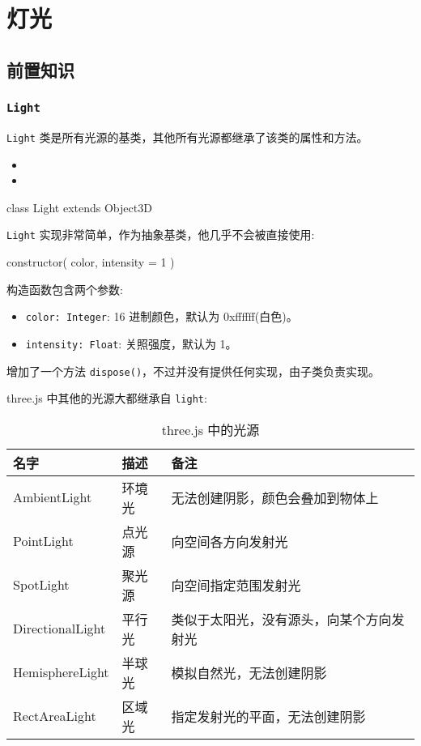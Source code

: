 \section{灯光}
\subsection{前置知识}
\subsubsection*{\texttt{Light}}

\texttt{Light} 类是所有光源的基类，其他所有光源都继承了该类的属性和方法。
\begin{itemize}
  \item {}
  \item {}
\end{itemize}

\begin{JavaScript}
class Light extends Object3D
\end{JavaScript}

\texttt{Light} 实现非常简单，作为抽象基类，他几乎不会被直接使用:

\begin{JavaScript}
constructor( color, intensity = 1 )
\end{JavaScript}

构造函数包含两个参数:
\begin{itemize}
  \item \texttt{color: Integer}: 16 进制颜色，默认为 0xffffff(白色)。
  \item \texttt{intensity: Float}: 关照强度，默认为 1。
\end{itemize}

增加了一个方法 \texttt{dispose()}，不过并没有提供任何实现，由子类负责实现。

three.js 中其他的光源大都继承自 \texttt{light}:

\begin{table}[H]
  \centering
  \small
  \caption{three.js 中的光源}
  \label{table:three.js 中的光源}
  \setlength{\tabcolsep}{4mm}
  \begin{tabular}{l|l|l}
    \toprule
    \textbf{名字} & \textbf{描述} & \textbf{备注} \\
    \midrule
    AmbientLight & 环境光 & 无法创建阴影，颜色会叠加到物体上 \\
    PointLight & 点光源 & 向空间各方向发射光 \\
    SpotLight & 聚光源 & 向空间指定范围发射光 \\
    DirectionalLight & 平行光 & 类似于太阳光，没有源头，向某个方向发射光 \\
    \midrule
    HemisphereLight & 半球光 & 模拟自然光，无法创建阴影 \\
    RectAreaLight & 区域光 & 指定发射光的平面，无法创建阴影 \\
    \bottomrule
  \end{tabular}
\end{table}

